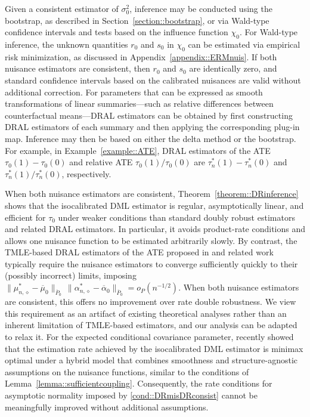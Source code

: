\documentclass[11pt]{article}
\theoremstyle{plain}
\begin{document}
Given a consistent estimator of \(\sigma_0^2\), inference may be conducted using
the bootstrap, as described in Section~\ref{section::bootstrap}, or via Wald-type
confidence intervals and tests based on the influence function \(\chi_0\). For
Wald-type inference, the unknown quantities \(r_0\) and \(s_0\) in \(\chi_0\) can
be estimated via empirical risk minimization, as discussed in
Appendix~\ref{appendix::ERMnuis}. If both nuisance
estimators are consistent, then \(r_0\) and \(s_0\) are identically zero, and
standard confidence intervals based on the calibrated nuisances are valid without
additional correction. For parameters that can be expressed as smooth transformations of linear
summaries---such as relative differences between counterfactual means---DRAL
estimators can be obtained by first constructing DRAL estimators of each summary
and then applying the corresponding plug-in map. Inference may then be based on
either the delta method or the bootstrap. For example, in
Example~\ref{example::ATE}, DRAL estimators of the ATE \(\tau_0(1)-\tau_0(0)\) and
relative ATE \(\tau_0(1)/\tau_0(0)\) are \(\tau_n^*(1)-\tau_n^*(0)\) and
\(\tau_n^*(1)/\tau_n^*(0)\), respectively.
 

When both nuisance estimators are consistent, Theorem~\ref{theorem::DRinference}
shows that the isocalibrated DML estimator is regular, asymptotically linear,
and efficient for \(\tau_0\) under weaker conditions than standard doubly robust
estimators and related DRAL estimators. In particular, it avoids product-rate
conditions and allows one nuisance function to be estimated arbitrarily
slowly. By contrast, the TMLE-based DRAL estimators of the ATE proposed in
\cite{van2014targeted} and related work \citep{benkeser2017doubly, dukes2024doubly}
typically require the nuisance estimators to converge sufficiently quickly to
their (possibly incorrect) limits, imposing $\|\mu_{n,\diamond}^* - \overline{\mu}_0\|_{\overline{P}_0}\,
\|\alpha_{n,\diamond}^* - \overline{\alpha}_0\|_{\overline{P}_0}
= o_P(n^{-1/2}).$
When both nuisance estimators are consistent, this offers no improvement over
rate double robustness. We view this requirement as an artifact of existing
theoretical analyses rather than an inherent limitation of TMLE-based
estimators, and our analysis can be adapted to relax it. For the expected conditional covariance parameter, \cite{bonvini2024doubly}
recently showed that the estimation rate achieved by the isocalibrated DML
estimator is minimax optimal under a hybrid model that combines smoothness and
structure-agnostic assumptions on the nuisance functions, similar to the
conditions of Lemma~\ref{lemma::sufficientcoupling}. Consequently, the rate
conditions for asymptotic normality imposed by \ref{cond::DRmisDRconsist}
cannot be meaningfully improved without additional assumptions.
\end{document}
